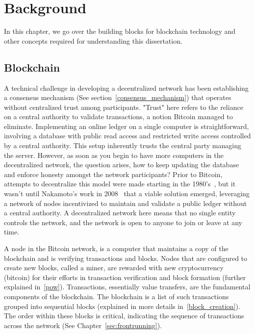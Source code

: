 


\chapter{Background} \label{sec:background}

In this chapter, we go over the building blocks for blockchain technology and other concepts required for understanding this dissertation.

\section{Blockchain}
A technical challenge in developing a decentralized network has been establishing a consensus mechanism (See section~\ref{consensus_mechanism}) that operates without centralized trust among participants. "Trust" here refers to the reliance on a central authority to validate transactions, a notion Bitcoin managed to eliminate. Implementing an online ledger on a single computer is straightforward, involving a database with public read access and restricted write access controlled by a central authority. This setup inherently trusts the central party managing the server. However, as soon as you begin to have more computers in the decentralized network, the question arises, how to keep updating the database and enforce honesty amongst the network participants? Prior to Bitcoin, attempts to decentralize this model were made starting in the 1980's~\cite{narayanan2017bitcoin}, but it wasn't until Nakamoto's work in 2008~\cite{nakamoto2008bitcoin} that a viable solution emerged, leveraging a network of nodes incentivized to maintain and validate a public ledger without a central authority. A decentralized network here means that no single entity controls the network, and the network is open to anyone to join or leave at any time.

A node in the Bitcoin network, is a computer that maintains a copy of the blockchain and is verifying transactions and blocks. Nodes that are configured to create new blocks, called a miner, are rewarded with new cryptocurrency (bitcoin) for their efforts in transaction verification and block formation (further explained in~\ref{pow}). Transactions, essentially value transfers, are the fundamental components of the blockchain. The blockchain is a list of such transactions grouped into sequential blocks (explained in more details in~\ref{block_creation}). The order within these blocks is critical, indicating the sequence of transactions across the network (See Chapter~\ref{sec:frontrunning}). 


